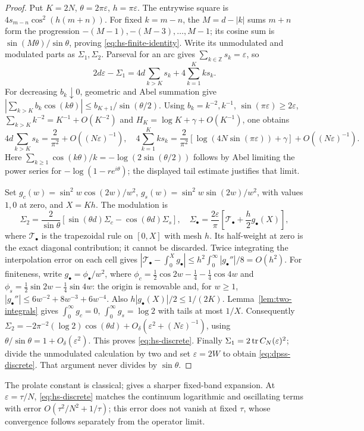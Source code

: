 \begin{proof}
Put $K=2N$, $\theta=2\pi\varepsilon$, $h=\pi\varepsilon$.
The entrywise square is $4s_{m-n}\cos^2(h(m+n))$.
For fixed $k=m-n$, the $M=d-|k|$ sums $m+n$ form the progression
$-(M-1),-(M-3),\ldots,M-1$; its cosine sum is
$\sin(M\theta)/\sin\theta$, proving \eqref{eq:hs-finite-identity}.
Write its unmodulated and modulated parts as $\Sigma_1,\Sigma_2$.
Parseval for an arc gives $\sum_{k\in\mathbb Z}s_k=\varepsilon$, so
\[
2d\varepsilon-\Sigma_1=4d\sum_{k>K}s_k+4\sum_{k=1}^Kks_k.
\]
For decreasing $b_k\downarrow0$, geometric and Abel summation give
$|\sum_{k>K}b_k\cos(k\theta)|\le b_{K+1}/\sin(\theta/2)$.
Using $b_k=k^{-2},k^{-1}$, $\sin(\pi\varepsilon)\ge2\varepsilon$,
$\sum_{k>K}k^{-2}=K^{-1}+O(K^{-2})$ and
$H_K=\log K+\gamma+O(K^{-1})$, one obtains
\[
4d\sum_{k>K}s_k=\frac2{\pi^2}+O((N\varepsilon)^{-1}),\quad
4\sum_{k=1}^Kks_k=
\frac2{\pi^2}[\log(4N\sin(\pi\varepsilon))+\gamma]
 +O((N\varepsilon)^{-1}).
\]
Here $\sum_{k\ge1}\cos(k\theta)/k=-\log(2\sin(\theta/2))$ follows
by Abel limiting the power series for $-\log(1-re^{i\theta})$;
the displayed tail estimate justifies that limit.

Set $g_c(w)=\sin^2w\cos(2w)/w^2$,
$g_s(w)=\sin^2w\sin(2w)/w^2$, with values $1,0$ at zero, and $X=Kh$.
The modulation is
\[
\Sigma_2=\frac2{\sin\theta}
[\sin(\theta d)\Sigma_c-\cos(\theta d)\Sigma_s],\quad
\Sigma_\bullet=\frac{2\varepsilon}{\pi}
\left[\mathcal T_\bullet+\frac h2g_\bullet(X)\right],
\]
where $\mathcal T_\bullet$ is the trapezoidal rule on $[0,X]$
with mesh $h$. Its half-weight at zero is the exact diagonal contribution;
it cannot be discarded. Twice integrating the interpolation error on
each cell gives
$|\mathcal T_\bullet-\int_0^Xg_\bullet|
\le h^2\int_0^\infty|g_\bullet''|/8=O(h^2)$.
For finiteness, write $g_\bullet=\phi_\bullet/w^2$, where
$\phi_c=\frac12\cos2w-\frac14-\frac14\cos4w$ and
$\phi_s=\frac12\sin2w-\frac14\sin4w$:
the origin is removable and, for $w\ge1$,
$|g_\bullet''|\le6w^{-2}+8w^{-3}+6w^{-4}$.
Also $h|g_\bullet(X)|/2\le1/(2K)$.
Lemma~\ref{lem:two-integrals} gives
$\int_0^\infty g_c=0$, $\int_0^\infty g_s=\log2$ with tails at most $1/X$.
Consequently
$\Sigma_2=-2\pi^{-2}(\log2)\cos(\theta d)
 +O_\delta(\varepsilon^2+(N\varepsilon)^{-1})$,
using $\theta/\sin\theta=1+O_\delta(\varepsilon^2)$.
This proves \eqref{eq:hs-discrete}.
Finally $\Sigma_1=2\operatorname{tr} C_N(\varepsilon)^2$; divide the unmodulated
calculation by two and set $\varepsilon=2W$ to obtain
\eqref{eq:dpss-discrete}. That argument never divides by $\sin\theta$.
\end{proof}
The prolate constant is classical; \cite[eq.~(D.6)]{AbanovIvanovQian2011}
gives a sharper fixed-band expansion. At $\varepsilon=\tau/N$,
\eqref{eq:hs-discrete} matches the continuum logarithmic and oscillating
terms with error $O(\tau^2/N^2+1/\tau)$; this error does not vanish
at fixed $\tau$, whose convergence follows separately from the operator limit.


